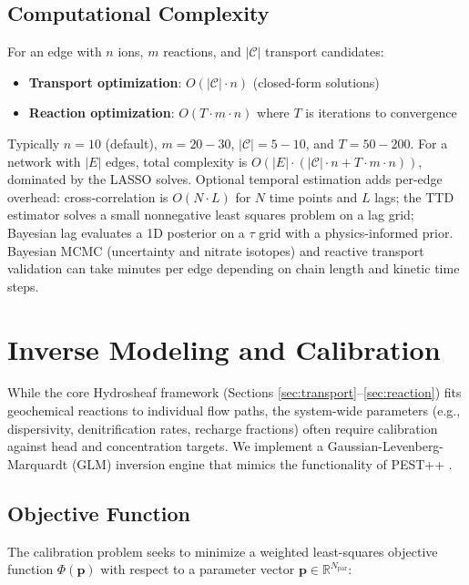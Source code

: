 \documentclass[12pt,a4paper]{article}
\theoremstyle{plain}
\theoremstyle{definition}
\theoremstyle{remark}
\begin{document}
\subsection{Computational Complexity}


For an edge with $n$ ions, $m$ reactions, and $|\mathcal{C}|$ transport candidates:
\begin{itemize}
	\item \textbf{Transport optimization}: $O(|\mathcal{C}| \cdot n)$ (closed-form solutions)
	\item \textbf{Reaction optimization}: $O(T \cdot m \cdot n)$ where $T$ is iterations to convergence
\end{itemize}

Typically $n=10$ (default), $m=20-30$, $|\mathcal{C}|=5-10$, and $T=50-200$. For a network with $|E|$ edges, total complexity is $O(|E| \cdot (|\mathcal{C}| \cdot n + T \cdot m \cdot n))$, dominated by the LASSO solves. Optional temporal estimation adds per-edge overhead: cross-correlation is $O(N\cdot L)$ for $N$ time points and $L$ lags; the TTD estimator solves a small nonnegative least squares problem on a lag grid; Bayesian lag evaluates a 1D posterior on a $\tau$ grid with a physics-informed prior. Bayesian MCMC (uncertainty and nitrate isotopes) and reactive transport validation can take minutes per edge depending on chain length and kinetic time steps.

\newpage
\section{Inverse Modeling and Calibration}\label{sec:calibration}

While the core Hydrosheaf framework (Sections \ref{sec:transport}--\ref{sec:reaction}) fits geochemical reactions to individual flow paths, the system-wide parameters (e.g., dispersivity, denitrification rates, recharge fractions) often require calibration against head and concentration targets. We implement a Gaussian-Levenberg-Marquardt (GLM) inversion engine that mimics the functionality of PEST++ \cite{white2020}.

\subsection{Objective Function}

The calibration problem seeks to minimize a weighted least-squares objective function $\Phi(\mathbf{p})$ with respect to a parameter vector $\mathbf{p} \in \mathbb{R}^{N_{\text{par}}}$:
\end{document}
